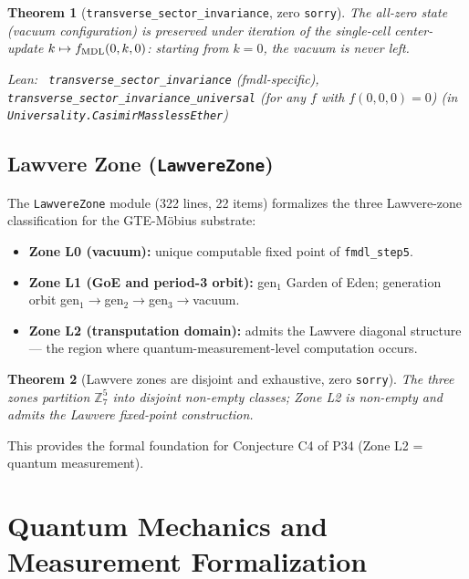\documentclass[11pt,a4paper]{article}
\newenvironment{leanref}%
  {\par\smallskip\noindent\begingroup\raggedright\textup{Lean:}~}%
  {\par\endgroup}
\newtheorem{theorem}{Theorem}[section]
\theoremstyle{definition}
\begin{document}
\begin{theorem}[\lstinline|transverse_sector_invariance|, zero \texttt{sorry}]
The all-zero state (vacuum configuration) is preserved under iteration of the
single-cell center-update $k \mapsto f_{\rm MDL}(0,k,0)$: starting from $k=0$,
the vacuum is never left.

\begin{leanref}
\lstinline|transverse_sector_invariance| (fmdl-specific),
\lstinline|transverse_sector_invariance_universal| (for any $f$ with $f(0,0,0)=0$)
\textup{(in \texttt{Universality.CasimirMasslessEther})}
\end{leanref}
\end{theorem}

\subsection[Lawvere Zone]{Lawvere Zone (\texttt{LawvereZone})}\label{subsec:lawvere-zone}

The \texttt{LawvereZone} module (322 lines, 22 items) formalizes the three
Lawvere-zone classification for the GTE-Möbius substrate:

\begin{itemize}[nosep]
\item \textbf{Zone L0 (vacuum):} unique computable fixed point of \lstinline|fmdl_step5|.
\item \textbf{Zone L1 (GoE and period-3 orbit):} gen$_1$ Garden of Eden; generation orbit
  gen$_1\to$gen$_2\to$gen$_3\to$vacuum.
\item \textbf{Zone L2 (transputation domain):} admits the Lawvere diagonal structure —
  the region where quantum-measurement-level computation occurs.
\end{itemize}

\begin{theorem}[Lawvere zones are disjoint and exhaustive, zero \texttt{sorry}]
The three zones partition $\mathbb{Z}_7^5$ into disjoint non-empty classes;
Zone L2 is non-empty and admits the Lawvere fixed-point construction.
\end{theorem}

This provides the formal foundation for Conjecture C4 of P34 (Zone L2 = quantum measurement).

\section{Quantum Mechanics and Measurement Formalization}\label{sec:quantum-mechanics}
\end{document}

